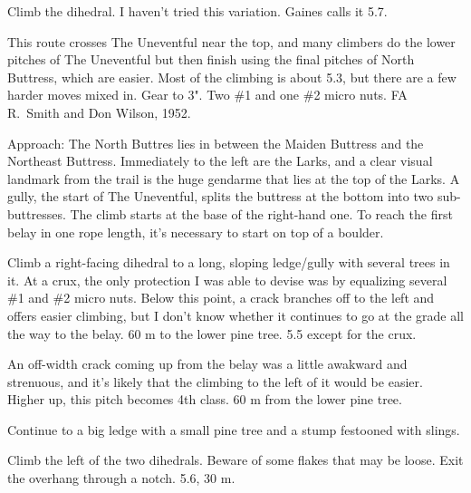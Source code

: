 \documentclass{tahquitz}
\begin{document}
 Climb the dihedral. I haven't tried this variation. Gaines calls it 5.7.

\somespace

\upfriction





This route crosses The Uneventful near the top, and many climbers do the lower
pitches of The Uneventful but then finish using the final pitches of
North Buttress, which are easier. Most of the climbing is about 5.3,
but there are a few harder moves mixed in. Gear to 3". Two \#1 and one \#2 micro nuts.
FA R.~Smith and Don Wilson, 1952.

Approach: The North Buttres lies
in between the Maiden Buttress and the Northeast Buttress. Immediately
to the left are the Larks, and a clear visual landmark from the trail
is the huge gendarme that lies at the top of the Larks. A gully, the start
of The Uneventful, splits the buttress at the bottom into two sub-buttresses.
The climb starts at the base of the right-hand one.
To reach the first belay in one rope length, it's necessary to start on top of a boulder.

\somespace

 Climb a right-facing dihedral to a long, sloping ledge/gully with
several trees in it. At a crux, the only protection I was able to devise was by
equalizing several \#1 and \#2 micro nuts. Below this point, a crack branches off
to the left and offers easier climbing, but I don't know whether it continues
to go at the grade all the way to the belay. 60 m to the lower pine tree. 5.5 except for
the crux.

 An off-width crack coming up from the belay was a little awakward and strenuous, and
it's likely that the climbing to the left of it would be easier. Higher up, this pitch
becomes 4th class. 60 m from the lower pine tree.

 Continue to a big ledge with a small pine tree and a stump festooned with
slings.

 Climb the left of the two dihedrals. Beware of some flakes that may be loose.
Exit the overhang through a notch. 5.6, 30 m.
\end{document}
